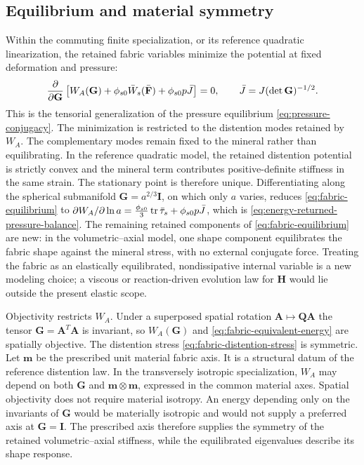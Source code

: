 \subsection{Equilibrium and material symmetry}
\label{sec:fabric-equilibrium}

Within the commuting finite specialization, or its reference quadratic
linearization, the retained fabric variables minimize the potential at
fixed deformation and pressure:
\begin{equation}
 \frac{\partial }{\partial \mathbf G}
 \left[W_A(\mathbf G)+\phi_{s0}\bar W_s(\bar{\mathbf F})
        +\phi_{s0}p\bar J\right]=0,\qquad
 \bar J=J(\det\mathbf G)^{-1/2}.
 \label{eq:fabric-equilibrium}
\end{equation}
This is the tensorial generalization of the pressure equilibrium
\eqref{eq:pressure-conjugacy}. The minimization is restricted to the
distention modes retained by \(W_A\). The complementary modes remain fixed
to the mineral rather than equilibrating. In the reference quadratic model,
the retained distention potential is strictly convex and the mineral term
contributes positive-definite stiffness in the same strain. The stationary
point is therefore unique. Differentiating along the spherical
submanifold \(\mathbf G=a^{2/3}\mathbf I\), on which only \(a\) varies,
reduces \eqref{eq:fabric-equilibrium} to
\(\partial W_A/\partial\ln a
=\tfrac{\phi_{s0}}3\operatorname{tr}\bar{\mathbf\tau}_s+\phi_{s0}p\bar J\), which is
\eqref{eq:energy-returned-pressure-balance}. The remaining retained
components of \eqref{eq:fabric-equilibrium} are new: in the
volumetric--axial model, one shape component equilibrates the
fabric shape against the mineral stress, with no external conjugate force.
Treating the fabric as an elastically equilibrated, nondissipative
internal variable is a new modeling choice; a viscous or reaction-driven
evolution law for \(\mathbf H\) would lie outside the present elastic
scope.

Objectivity restricts \(W_A\). Under a superposed spatial rotation
\(\mathbf A\mapsto\mathbf Q\mathbf A\) the tensor
\(\mathbf G=\mathbf A^T\mathbf A\) is invariant, so \(W_A(\mathbf G)\)
and \eqref{eq:fabric-equivalent-energy} are spatially objective. The
distention stress \eqref{eq:fabric-distention-stress} is symmetric. Let
\(\mathbf m\) be the prescribed unit material fabric axis. It is a
structural datum of the reference distention law. In the transversely
isotropic specialization,
\(W_A\) may depend on both \(\mathbf G\) and
\(\mathbf m\otimes\mathbf m\), expressed in the common material axes.
Spatial objectivity does not require material isotropy. An energy depending
only on the invariants of \(\mathbf G\) would be materially isotropic and
would not supply a preferred axis at \(\mathbf G=\mathbf I\).
The prescribed axis therefore supplies the symmetry of the retained
volumetric--axial stiffness, while the equilibrated eigenvalues describe
its shape response.

